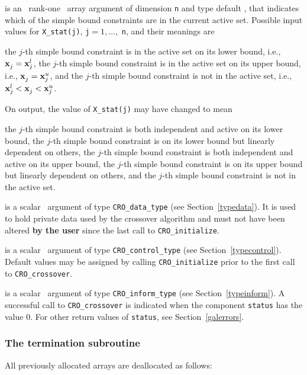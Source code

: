 \documentclass{galahad}
\newcommand{\packagename}{CRO}
\begin{document}
\begin{description}
 is an \intentin\ rank-one \intentinout\ array argument of
dimension {\tt n}
and type default \integer, that indicates which of the simple bound
constraints are in the current active set. Possible input values for
{\tt X\_stat(j)}, {\tt j}$=1, \ldots ,$ {\tt n}, and their meanings are
\begin{description}
 the $j$-th simple bound constraint
is in the active set on its lower bound, i.e., ${\mathbf{x}}_j^{} = {\mathbf{x}}_j^{l}$,
 the $j$-th simple bound constraint
is in the active set on its upper bound, i.e., ${\mathbf{x}}_j^{} = {\mathbf{x}}_j^{u}$,
and
  the $j$-th simple bound constraint is not in the active set,
i.e., ${\mathbf{x}}_j^{l} < {\mathbf{x}}_j^{} < {\mathbf{x}}_j^{u}$.
\end{description}
On output, the value of {\tt X\_stat(j)} may have changed to mean
\begin{description}
 the $j$-th simple bound constraint
is both independent and active on its lower bound,
 the $j$-th simple bound constraint
is on its lower bound but linearly dependent on others,
 the $j$-th simple bound constraint
is both independent and active on its upper bound,
 the $j$-th simple bound constraint
is on its upper bound but linearly dependent on others, and
 the $j$-th simple bound constraint is not in the active set.
\end{description}

 is a scalar \intentinout\ argument of type
{\tt \packagename\_data\_type}
(see Section~\ref{typedata}).
It is used to hold private data used by the crossover algorithm
and must not have been altered {\bf by the user} since the last call to
{\tt \packagename\_initialize}.

 is a scalar \intentin\ argument of type
{\tt \packagename\_control\_type}
(see Section~\ref{typecontrol}). Default values may be assigned by calling
{\tt \packagename\_initialize} prior to the first call to
{\tt \packagename\_crossover}.

 is a scalar \intentinout\ argument of type
{\tt \packagename\_inform\_type}
(see Section~\ref{typeinform}).
A successful call to
{\tt \packagename\_crossover}
is indicated when the  component {\tt status} has the value 0.
For other return values of {\tt status}, see Section~\ref{galerrors}.

\end{description}


\subsubsection{The  termination subroutine}
All previously allocated arrays are deallocated as follows:
\vspace*{1mm}
\end{document}
